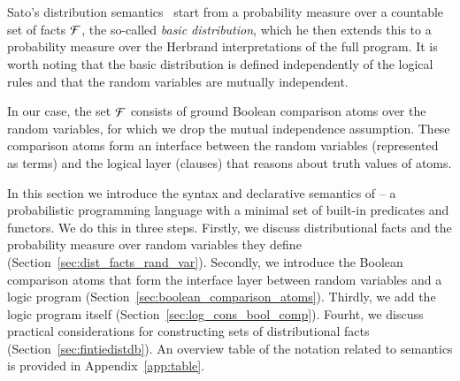 \section{\dfplpsty}\label{sec:semantics}

Sato's distribution semantics~\citep{sato1995statistical} start from a probability measure over a countable set of facts $\mathcal{F}$, the so-called \emph{basic distribution}, which he then extends this to a probability measure over the Herbrand interpretations of the full program.
It is worth noting that the basic distribution is defined independently of the logical rules and that the random variables are mutually independent.

In our case, the set $\mathcal{F}$ consists of ground Boolean comparison atoms over the random variables, for which we drop the mutual independence assumption. These comparison atoms form an interface between the random variables (represented as terms) and the logical layer (clauses) that reasons about truth values of atoms.


In this section we introduce the syntax and declarative semantics of \dfplpsty -- a probabilistic programming language with a minimal set of built-in predicates and functors. 
We do this in three steps.
Firstly, we discuss distributional facts and the probability measure over random variables they define (Section~\ref{sec:dist_facts_rand_var}).
Secondly, we introduce the Boolean comparison atoms that form the interface layer between random variables and a logic program (Section~\ref{sec:boolean_comparison_atoms}).
Thirdly, we add the logic program itself (Section~\ref{sec:log_cons_bool_comp}).
Fourht, we discuss practical considerations for constructing sets of distributional facts (Section~\ref{sec:fintiedistdb}).
An overview table of the notation related to semantics is provided in Appendix~\ref{app:table}.

